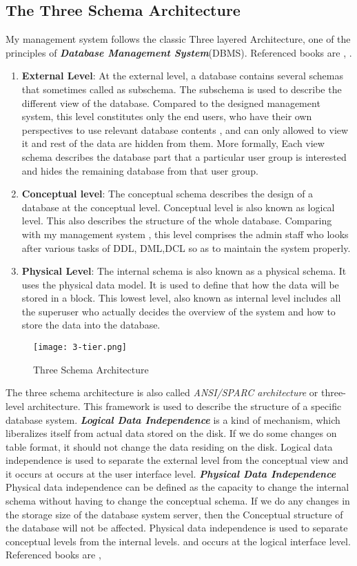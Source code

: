 \documentclass[12pt]{report}
\begin{document}
\subsection{The Three Schema Architecture}
My management system follows the classic Three layered
Architecture, one of the principles of \textbf{\textit{Database Management System}}(DBMS). Referenced books are \cite{DUMMY:1}, \cite{DUMMY:2}.
\begin{enumerate}
\item \textbf{External Level}: At the external level, a database contains several schemas that sometimes called as subschema. The subschema is used to describe the different view of the database. Compared to the designed management system, this level constitutes only the end users,
who have their own perspectives to use relevant database
contents , and can only allowed to view it and rest of the data
are hidden from them. More formally, Each view schema describes the database part that a particular user group is interested and hides the remaining database from that user group.
\item \textbf{Conceptual level}: The conceptual schema describes the design of a database at the conceptual level. Conceptual level is also known as logical level. This also describes the structure of the whole database. Comparing with my management system
, this level comprises the admin staff who looks after various
tasks of DDL, DML,DCL so as to maintain the system properly.
\item \textbf{Physical Level}: The internal schema is also known as a physical schema.
It uses the physical data model. It is used to define that how the data will be stored in a block.
This lowest level, also known as internal level
includes all the superuser who actually decides the overview of
the system and how to store the data into the database.
\end{enumerate}
\begin{figure}[!htb]
\texttt{[image: 3-tier.png]}
\centering
\caption{Three Schema Architecture}

\end{figure}
The three schema architecture is also called \textit{ANSI/SPARC architecture} or three-level architecture.
This framework is used to describe the structure of a specific database system. \newline
\textbf{\textit{Logical Data Independence}} is a kind of mechanism, which liberalizes itself from actual data stored on the disk. If we do some changes on table format, it should not change the data residing on the disk. Logical data independence is used to separate the external level from the conceptual view and it occurs at occurs at the user interface level.\newline
\textbf{\textit{Physical Data Independence}} 
    Physical data independence can be defined as the capacity to change the internal schema without having to change the conceptual schema.
    If we do any changes in the storage size of the database system server, then the Conceptual structure of the database will not be affected.
    Physical data independence is used to separate conceptual levels from the internal levels.
    and occurs at the logical interface level. Referenced books are \cite{DUMMY:5},
\end{document}
